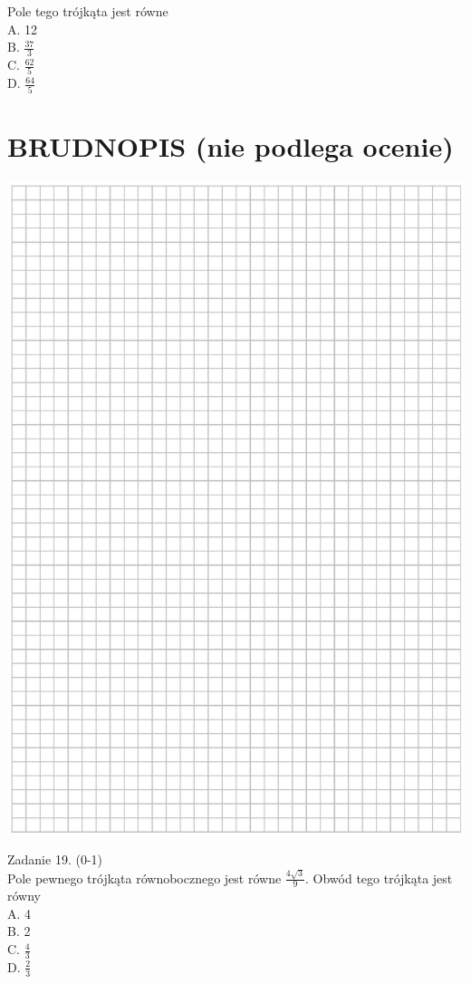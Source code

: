 \documentclass[10pt]{article}
\begin{document}
Pole tego trójkąta jest równe\\
A. 12\\
B. \(\frac{37}{3}\)\\
C. \(\frac{62}{5}\)\\
D. \(\frac{64}{5}\)

\section*{BRUDNOPIS (nie podlega ocenie)}
\begin{center}
\includegraphics[max width=\textwidth]{2024_11_21_46d945490f1b2eff1c8eg-09}
\end{center}

Zadanie 19. (0-1)\\
Pole pewnego trójkąta równobocznego jest równe \(\frac{4 \sqrt{3}}{9}\). Obwód tego trójkąta jest równy\\
A. 4\\
B. 2\\
C. \(\frac{4}{3}\)\\
D. \(\frac{2}{3}\)
\end{document}
